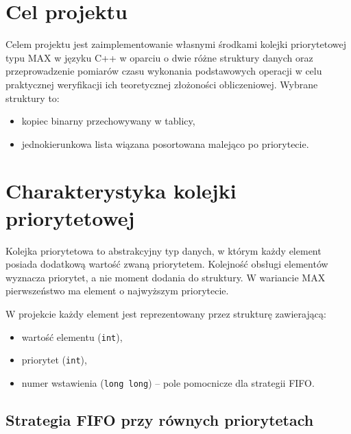 




\pagestyle{empty}

\section{Cel projektu}

Celem projektu jest zaimplementowanie własnymi środkami kolejki priorytetowej
typu MAX w języku C++ w oparciu o dwie różne struktury danych oraz przeprowadzenie
pomiarów czasu wykonania podstawowych operacji w celu praktycznej weryfikacji
ich teoretycznej złożoności obliczeniowej. Wybrane struktury to:
\begin{itemize}
    \item kopiec binarny przechowywany w tablicy,
    \item jednokierunkowa lista wiązana posortowana malejąco po priorytecie.
\end{itemize}

\section{Charakterystyka kolejki priorytetowej}

Kolejka priorytetowa to abstrakcyjny typ danych, w którym każdy element posiada
dodatkową wartość zwaną priorytetem. Kolejność obsługi elementów wyznacza
priorytet, a nie moment dodania do struktury. W wariancie MAX pierwszeństwo ma
element o najwyższym priorytecie.

W projekcie każdy element jest reprezentowany przez strukturę zawierającą:
\begin{itemize}
    \item wartość elementu (\texttt{int}),
    \item priorytet (\texttt{int}),
    \item numer wstawienia (\texttt{long long}) -- pole pomocnicze dla strategii FIFO.
\end{itemize}

\subsection{Strategia FIFO przy równych priorytetach}

